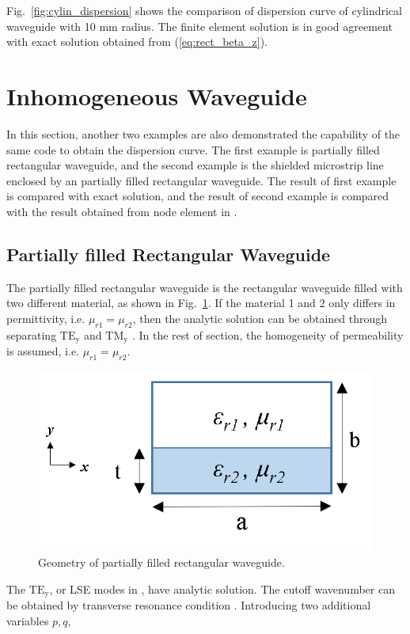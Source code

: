 \documentclass{pj}
\begin{document}
Fig.~\ref{fig:cylin_dispersion} shows the comparison of dispersion curve of cylindrical waveguide with 10 mm radius. The finite element solution is in good agreement with exact solution obtained from (\ref{eq:rect_beta_z}).

\section{Inhomogeneous Waveguide}
\label{sec:inhomo_wg}
In this section, another two examples are also demonstrated the capability of the same code to obtain the dispersion curve. The first example is partially filled rectangular waveguide, and the second example is the shielded microstrip line enclosed by an partially filled rectangular waveguide. The result of first example is compared with exact solution, and the result of second example is compared with the result obtained from node element in \cite{na_JinJM_JinJM_2014_finite_element}. 

\subsection{Partially filled Rectangular Waveguide}
\label{subsec:rect_inhomo}
The partially filled rectangular waveguide is the rectangular waveguide filled with two different material, as shown in Fig.~\ref{fig:rect_inhomo_geom}. If the material 1 and 2 only differs in permittivity, i.e. $\mu_{r1} = \mu_{r2}$, then the analytic solution can be obtained through separating $\mathrm{TE_{y}}$ and $\mathrm{TM_y}$ \cite{na_CollinRE_CollinRE_1991_field_theory}. In the rest of section, the homogeneity of permeability is assumed, i.e. $\mu_{r1} = \mu_{r2}$.
%
\begin{figure}[htbp]
	\centering
	\includegraphics[width=0.5\columnwidth]{./img/rectangular_inhomo/geometry.png}
	\caption{Geometry of partially filled rectangular waveguide. }
	\label{fig:rect_inhomo_geom}
\end{figure}

The $\mathrm{TE_{y}}$, or LSE modes in \cite{na_CollinRE_CollinRE_1991_field_theory}, have analytic solution. The cutoff wavenumber can be obtained by transverse resonance condition \cite{na_CollinRE_CollinRE_1991_field_theory}. Introducing two additional variables $p,q$, 
\end{document}
